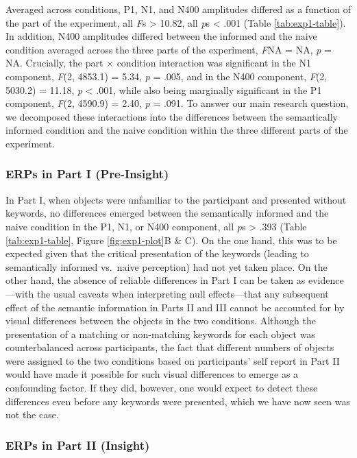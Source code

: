 \documentclass[
  english,
  man,11pt,floatsintext]{apa7}
\begin{document}
Averaged across conditions, P1, N1, and N400 amplitudes differed as a function of the part of the experiment, all \emph{F}s \textgreater{} 10.82, all \emph{p}s \textless{} .001 (Table \ref{tab:exp1-table}). In addition, N400 amplitudes differed between the informed and the naive condition averaged across the three parts of the experiment, \emph{F}NA = NA, \emph{p} = NA. Crucially, the part × condition interaction was significant in the N1 component, \emph{F}(2, 4853.1) = 5.34, \emph{p} = .005, and in the N400 component, \emph{F}(2, 5030.2) = 11.18, \emph{p} \textless{} .001, while also being marginally significant in the P1 component, \emph{F}(2, 4590.9) = 2.40, \emph{p} = .091. To answer our main research question, we decomposed these interactions into the differences between the semantically informed condition and the naive condition within the three different parts of the experiment.

\hypertarget{erps-in-part-i-pre-insight}{%
\subsubsection{ERPs in Part I (Pre-Insight)}\label{erps-in-part-i-pre-insight}}

In Part I, when objects were unfamiliar to the participant and presented without keywords, no differences emerged between the semantically informed and the naive condition in the P1, N1, or N400 component, all \emph{p}s \textgreater{} .393 (Table \ref{tab:exp1-table}, Figure \ref{fig:exp1-plot}B \& C). On the one hand, this was to be expected given that the critical presentation of the keywords (leading to semantically informed vs.~naive perception) had not yet taken place. On the other hand, the absence of reliable differences in Part I can be taken as evidence---with the usual caveats when interpreting null effects---that any subsequent effect of the semantic information in Parts II and III cannot be accounted for by visual differences between the objects in the two conditions. Although the presentation of a matching or non-matching keywords for each object was counterbalanced across participants, the fact that different numbers of objects were assigned to the two conditions based on participants' self report in Part II would have made it possible for such visual differences to emerge as a confounding factor. If they did, however, one would expect to detect these differences even before any keywords were presented, which we have now seen was not the case.

\hypertarget{erps-in-part-ii-insight}{%
\subsubsection{ERPs in Part II (Insight)}\label{erps-in-part-ii-insight}}
\end{document}

